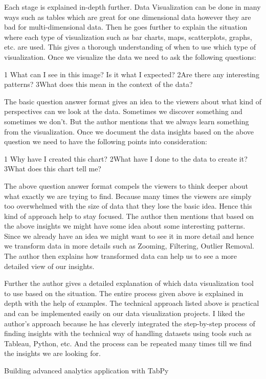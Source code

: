 \documentclass[]{book}
\theoremstyle{definition}
\theoremstyle{definition}
\theoremstyle{definition}
\theoremstyle{remark}
\begin{document}
Each stage is explained in-depth further. Data Visualization can be done
in many ways such as tables which are great for one dimensional data
however they are bad for multi-dimensional data. Then he goes further to
explain the situation where each type of visualization such as bar
charts, maps, scatterplots, graphs, etc. are used. This gives a thorough
understanding of when to use which type of visualization. Once we
visualize the data we need to ask the following questions:

1 What can I see in this image? Is it what I expected? 2Are there any
interesting patterns? 3What does this mean in the context of the data?

The basic question answer format gives an idea to the viewers about what
kind of perspectives can we look at the data. Sometimes we discover
something and sometimes we don't. But the author mentions that we always
learn something from the visualization. Once we document the data
insights based on the above question we need to have the following
points into consideration:

1 Why have I created this chart? 2What have I done to the data to create
it? 3What does this chart tell me?

The above question answer format compels the viewers to think deeper
about what exactly we are trying to find. Because many times the viewers
are simply too overwhelmed with the size of data that they lose the
basic idea. Hence this kind of approach help to stay focused. The author
then mentions that based on the above insights we might have some idea
about some interesting patterns. Since we already have an idea we might
want to see it in more detail and hence we transform data in more
details such as Zooming, Filtering, Outlier Removal. The author then
explains how transformed data can help us to see a more detailed view of
our insights.

Further the author gives a detailed explanation of which data
visualization tool to use based on the situation. The entire process
given above is explained in depth with the help of examples. The
technical approach listed above is practical and can be implemented
easily on our data visualization projects. I liked the author's approach
because he has cleverly integrated the step-by-step process of finding
insights with the technical way of handling datasets using tools such as
Tableau, Python, etc. And the process can be repeated many times till we
find the insights we are looking for.

Building advanced analytics application with TabPy
\end{document}
